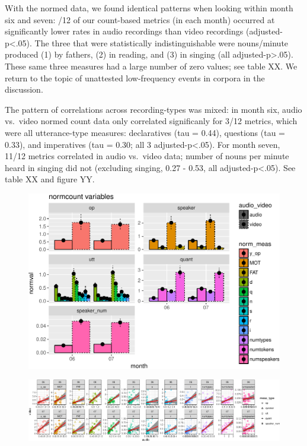 \documentclass[man]{apa6}
\theoremstyle{definition}
\theoremstyle{definition}
\theoremstyle{definition}
\theoremstyle{remark}
\begin{document}
With the normed data, we found identical patterns when looking within
month six and seven: /12 of our count-based metrics (in each month)
occurred at significantly lower rates in audio recordings than video
recordings (adjusted-p\textless{}.05). The three that were statistically
indistinguishable were nouns/minute produced (1) by fathers, (2) in
reading, and (3) in singing (all adjusted-p\textgreater{}.05). These
same three measures had a large number of zero values; see table XX. We
return to the topic of unattested low-frequency events in corpora in the
discussion.

The pattern of correlations across recording-types was mixed: in month
six, audio vs.~video normed count data only correlated significanly for
3/12 metrics, which were all utterance-type measures: declaratives (tau
= 0.44), questions (tau = 0.33), and imperatives (tau = 0.30; all 3
adjusted-p\textless{}.05). For month seven, 11/12 metrics correlated in
audio vs.~video data; number of nouns per minute heard in singing did
not (excluding singing, 0.27 - 0.53, all adjusted-p\textless{}.05). See
table XX and figure YY.

\begin{figure}[htbp]
\centering
\includegraphics{sixseven_papaja_files/figure-latex/gr_derived_counts_diff-1.pdf}
\caption{}
\end{figure}

\begin{figure}[htbp]
\centering
\includegraphics{sixseven_papaja_files/figure-latex/gr_derived_counts_corr-1.pdf}
\caption{}
\end{figure}
\end{document}
